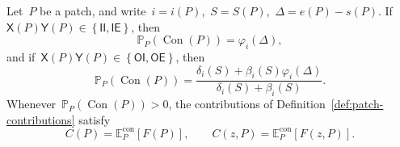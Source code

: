 \documentclass[EJP,preprint,NODS,nobera]{ejpecp}
\newcommand{\pP}{\mathbb{P}}
\newcommand{\E}{\mathbb{E}}
\newcommand{\bb}[1]{\left(#1\right)}
\newcommand{\Cb}[1]{\left[#1\right]}
\newcommand{\cb}[1]{\left\{#1\right\}}
\newcommand{\chg}[1]{{\color{changegreen}#1}}
\begin{document}
\chg{\begin{lemma}
\label{lem:contribution-formulas}
Let~$P$ be a patch, and write~$i=i(P)$,~$S=S(P)$,~$\Delta=e(P)-s(P)$. If
$\mathsf X(P)\mathsf Y(P)\in\cb{\mathsf{II},\mathsf{IE}}$, then
\begin{equation*}
\pP_P\bb{\operatorname{Con}(P)}
=
\varphi_i(\Delta),
\end{equation*}
and if~$\mathsf X(P)\mathsf Y(P)\in\cb{\mathsf{OI},\mathsf{OE}}$, then
\begin{equation*}
\pP_P\bb{\operatorname{Con}(P)}
=
\frac{
\delta_i(S)+\beta_i(S)\varphi_i(\Delta)
}{
\delta_i(S)+\beta_i(S)
}.
\end{equation*}
Whenever~$\pP_P\bb{\operatorname{Con}(P)}>0$, the contributions of
Definition~\ref{def:patch-contributions} satisfy
\begin{equation*}
C(P)=\E_P^{\mathrm{con}}\Cb{F(P)},
\qquad
C(z,P)=\E_P^{\mathrm{con}}\Cb{F(z,P)}.
\end{equation*}
\end{lemma}}
\end{document}
